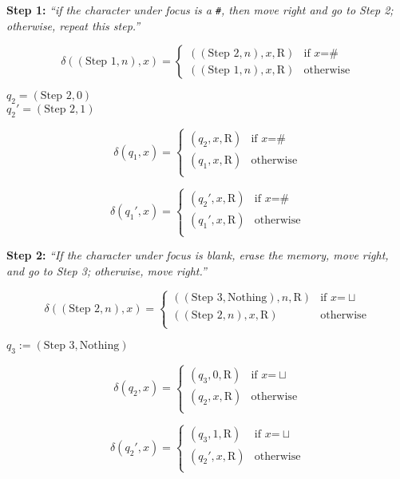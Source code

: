 \documentclass[
  ignorenonframetext,
]{beamer}
\begin{document}
\begin{frame}[fragile]
\protect\hypertarget{step-1}{}


\textbf{Step 1:} \emph{``if the character under focus is a \texttt{\#}, then move right and go to Step 2; otherwise, repeat this step.''}\pause

\[\delta((\text{Step 1}, n), x) = \begin{cases}
((\text{Step 2}, n) ,x, \mathrm{R}) & \text{if } x \text{=} \#\\
((\text{Step 1}, n),x, \mathrm{R}) & \text{otherwise}
\end{cases}
\]\pause


$q_2=(\text{Step 2},0)$\\
$q_2'=(\text{Step 2},1)$\pause

\[\delta(q_1, x) = \begin{cases}
(q_2 ,x, \mathrm{R}) & \text{if } x \text{=} \#\\
(q_1,x, \mathrm{R}) & \text{otherwise}\\
\end{cases}
\]

\[\delta(q_1', x) = \begin{cases}
(q_2' ,x, \mathrm{R}) & \text{if } x \text{=} \#\\
(q_1',x, \mathrm{R}) & \text{otherwise}\\
\end{cases}
\]

\end{frame}

\begin{frame}
\protect\hypertarget{step-2}{}


\textbf{Step 2:} \emph{``If the character under focus is blank, erase the memory, move right, and go to Step 3; otherwise, move right.''}\pause

\[\delta((\text{Step 2},n), x) = \begin{cases}
((\text{Step 3},\text{Nothing}),n, \mathrm{R}) & \text{if } x \text{=} \sqcup\\
((\text{Step 2},n),x, \mathrm{R}) & \text{otherwise}\\
\end{cases}
\]\pause


$q_3:=(\text{Step 3},\text{Nothing})$\pause

\[\delta(q_2, x) = \begin{cases}
(q_3,0, \mathrm{R}) & \text{if } x \text{=} \sqcup\\
(q_2,x, \mathrm{R}) & \text{otherwise}\\
\end{cases}
\]

\[\delta(q_2', x) = \begin{cases}
(q_3,1, \mathrm{R}) & \text{if } x \text{=} \sqcup \\
(q_2',x, \mathrm{R}) & \text{otherwise}\\
\end{cases}
\]

\end{frame}
\end{document}
